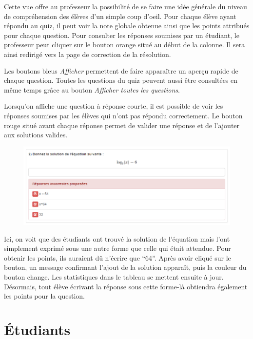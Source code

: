 \documentclass[a4,10pt,french]{sphinxmanual}
\begin{document}
Cette vue offre au professeur la possibilité de se faire une idée générale du niveau de compréhension des élèves d'un simple coup d'oeil. Pour chaque élève ayant répondu au quiz, il peut voir la note globale obtenue ainsi que les points attribués pour chaque question. Pour consulter les réponses soumises par un étudiant, le professeur peut cliquer sur le bouton orange situé au début de la colonne. Il sera ainsi redirigé vers la page de correction de la résolution.

Les boutons bleus \emph{Afficher} permettent de faire apparaître un aperçu rapide de chaque question. Toutes les questions du quiz peuvent aussi être consultées en même temps grâce au bouton \emph{Afficher toutes les questions}.

Lorsqu'on affiche une question à réponse courte, il est possible de voir les réponses soumises par les élèves qui n'ont pas répondu correctement. Le bouton rouge situé avant chaque réponse permet de valider une réponse et de l'ajouter aux solutions valides.
\begin{figure}[htbp]
\centering

\includegraphics{add-solution.png}
\end{figure}

Ici, on voit que des étudiants ont trouvé la solution de l'équation mais l'ont simplement exprimé sous une autre forme que celle qui était attendue. Pour obtenir les points, ils auraient dû n'écrire que ``64''. Après avoir cliqué sur le bouton, un message confirmant l'ajout de la solution apparaît, puis la couleur du bouton change. Les statistiques dans le tableau se mettent ensuite à jour. Désormais, tout élève écrivant la réponse sous cette forme-là obtiendra également les points pour la question.


\section{Étudiants}
\label{doc-user:etudiants}
\end{document}
